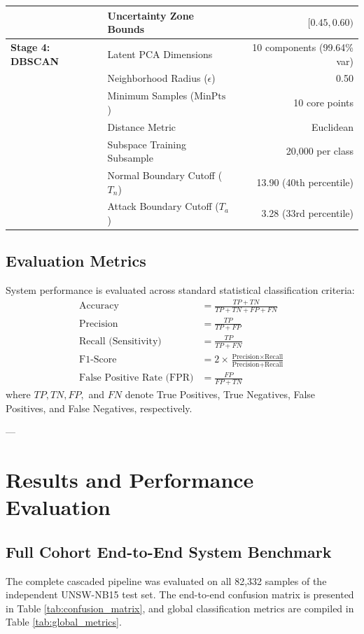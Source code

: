 \documentclass[preprint,12pt]{elsarticle}
\begin{document}
\begin{table}[t]
\begin{tabular}{llr}
                               & Uncertainty Zone Bounds           & $[0.45, 0.60)$ \\
\midrule
\textbf{Stage 4: DBSCAN}       & Latent PCA Dimensions             & 10 components (99.64\% var) \\
                               & Neighborhood Radius ($\epsilon$)  & 0.50 \\
                               & Minimum Samples ($\text{MinPts}$) & 10 core points \\
                               & Distance Metric                   & Euclidean \\
                               & Subspace Training Subsample       & 20,000 per class \\
                               & Normal Boundary Cutoff ($T_n$)    & 13.90 (40th percentile) \\
                               & Attack Boundary Cutoff ($T_a$)    & 3.28 (33rd percentile) \\
\bottomrule
\end{tabular}
\end{table}

\subsection{Evaluation Metrics}
System performance is evaluated across standard statistical classification criteria:
\begin{align}
    \text{Accuracy} &= \frac{TP + TN}{TP + TN + FP + FN} \\
    \text{Precision} &= \frac{TP}{TP + FP} \\
    \text{Recall (Sensitivity)} &= \frac{TP}{TP + FN} \\
    \text{F1-Score} &= 2 \times \frac{\text{Precision} \times \text{Recall}}{\text{Precision} + \text{Recall}} \\
    \text{False Positive Rate (FPR)} &= \frac{FP}{FP + TN}
\end{align}
where $TP, TN, FP,$ and $FN$ denote True Positives, True Negatives, False Positives, and False Negatives, respectively.

---

\section{Results and Performance Evaluation}
\label{sec:results}

\subsection{Full Cohort End-to-End System Benchmark}
The complete cascaded pipeline was evaluated on all 82,332 samples of the independent UNSW-NB15 test set. The end-to-end confusion matrix is presented in Table \ref{tab:confusion_matrix}, and global classification metrics are compiled in Table \ref{tab:global_metrics}.
\end{document}
